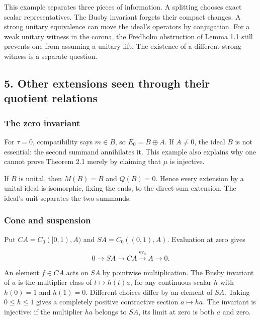 \documentclass[
  11pt,
]{article}
\begin{document}
This example separates three pieces of information. A splitting chooses
exact scalar representatives. The Busby invariant forgets their compact
changes. A strong unitary equivalence can move the ideal's operators by
conjugation. For a weak unitary witness in the corona, the Fredholm
obstruction of Lemma 1.1 still prevents one from assuming a unitary
lift. The existence of a different strong witness is a separate
question.

\subsection{5. Other extensions seen through their quotient
relations}\label{other-extensions-seen-through-their-quotient-relations}

\subsubsection{The zero invariant}\label{the-zero-invariant}

For \(\tau=0\), compatibility says \(m\in B\), so \(E_0=B\oplus A\). If
\(A\ne0\), the ideal \(B\) is not essential: the second summand
annihilates it. This example also explains why one cannot prove Theorem
2.1 merely by claiming that \(\mu\) is injective.

If \(B\) is unital, then \(M(B)=B\) and \(Q(B)=0\). Hence every
extension by a unital ideal is isomorphic, fixing the ends, to the
direct-sum extension. The ideal's unit separates the two summands.

\subsubsection{Cone and suspension}\label{cone-and-suspension}

Put \(CA=C_0([0,1),A)\) and \(SA=C_0((0,1),A)\). Evaluation at zero
gives

\[
0\longrightarrow SA\longrightarrow CA
\overset{\operatorname{ev}_0}{\longrightarrow}A\longrightarrow0.
\]

An element \(f\in CA\) acts on \(SA\) by pointwise multiplication. The
Busby invariant of \(a\) is the multiplier class of \(t\mapsto h(t)a\),
for any continuous scalar \(h\) with \(h(0)=1\) and \(h(1)=0\).
Different choices differ by an element of \(SA\). Taking
\(0\leq h\leq1\) gives a completely positive contractive section
\(a\mapsto ha\). The invariant is injective: if the multiplier \(ha\)
belongs to \(SA\), its limit at zero is both \(a\) and zero.
\end{document}
